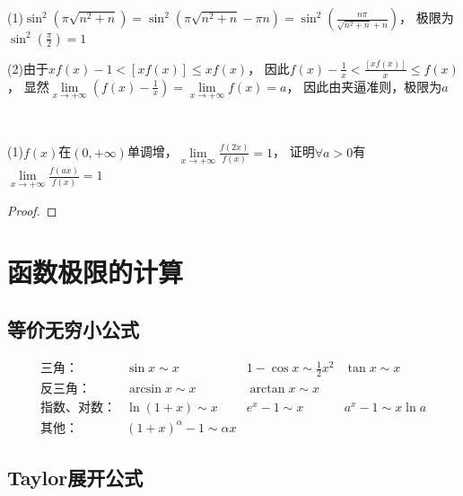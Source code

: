 \begin{solution}
  (1)$\sin^2(\pi \sqrt{n^2 + n}) = \sin^2 (\pi \sqrt{n^2 + n} - \pi n) = \sin^2 (\frac{n\pi}{\sqrt{n^2 + n} + n})$，
  极限为$\sin^2(\frac{\pi}{2}) = 1$

  (2)由于$xf(x) - 1 < [xf(x)] \leq xf(x)$，
  因此$f(x) - \frac{1}{x} < \frac{[xf(x)]}{x} \leq f(x)$，
  显然$\lim \limits _{x \rightarrow +\infty} \left( f(x) - \frac{1}{x} \right) = \lim \limits _{x \rightarrow +\infty}f(x) = a$，
  因此由夹逼准则，极限为$a$
\end{solution}

~

\begin{exercise}[几个经典递推问题]
  (1)$f(x)$在$(0,+\infty)$单调增，$\lim \limits _{x \rightarrow +\infty}\frac{f(2x)}{f(x)} = 1$，
  证明$\forall a > 0$有$\lim \limits _{x \rightarrow +\infty}\frac{f(ax)}{f(x)} = 1$
\end{exercise}

\begin{proof}
  
\end{proof}



\section{函数极限的计算}

\subsection{等价无穷小公式}

\begin{equation*}
  \begin{array}{llll}
    \text{三角：}&\sin x \sim x&1 - \cos x \sim \frac{1}{2}x^2&\tan x \sim x\\
    \text{反三角：}& \arcsin x \sim x& \arctan x \sim x&\\
    \text{指数、对数：}&\ln(1 + x)\sim x& e^x - 1 \sim x& a^x - 1 \sim x \ln a\\
    \text{其他：}&(1 + x)^{\alpha} - 1 \sim \alpha x&&
  \end{array}
\end{equation*}


\subsection{Taylor展开公式}

